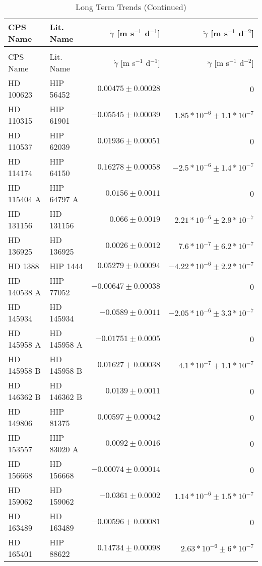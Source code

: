 \begin{longtable*}{llrr}
\caption{Long Term Trends} \\
\toprule
\midrule

CPS Name & Lit. Name & $\dot \gamma$ [m s$^{-1}$ d$^{-1}$] & $\ddot \gamma$ [m s$^{-1}$ d$^{-2}$] \\
\toprule
\endfirsthead
\caption[]{Long Term Trends (Continued)} \\
\toprule
\midrule
CPS Name & Lit. Name & $\dot \gamma$ [m s$^{-1}$ d$^{-1}$] & $\ddot \gamma$ [m s$^{-1}$ d$^{-2}$] \\
\toprule
\endhead
HD 100623 & HIP 56452 & $0.00475\pm 0.00028$ & 0 \\
HD 110315 & HIP 61901 & $-0.05545\pm 0.00039$ & $1.85*10^{-6}\pm 1.1*10^{-7}$ \\
HD 110537 & HIP 62039 & $0.01936\pm 0.00051$ & 0 \\
HD 114174 & HIP 64150 & $0.16278\pm 0.00058$ & $-2.5*10^{-6}\pm 1.4*10^{-7}$ \\
HD 115404 A & HIP 64797 A & $0.0156\pm 0.0011$ & 0 \\
HD 131156 & HD 131156 & $0.066\pm 0.0019$ & $2.21*10^{-6}\pm 2.9*10^{-7}$ \\
HD 136925 & HD 136925 & $0.0026\pm 0.0012$ & $7.6*10^{-7}\pm 6.2*10^{-7}$ \\
HD 1388 & HIP 1444 & $0.05279\pm 0.00094$ & $-4.22*10^{-6}\pm 2.2*10^{-7}$ \\
HD 140538 A & HIP 77052 & $-0.00647\pm 0.00038$ & 0 \\
HD 145934 & HD 145934 & $-0.0589\pm 0.0011$ & $-2.05*10^{-6}\pm 3.3*10^{-7}$ \\
HD 145958 A & HD 145958 A & $-0.01751\pm 0.0005$ & 0 \\
HD 145958 B & HD 145958 B & $0.01627\pm 0.00038$ & $4.1*10^{-7}\pm 1.1*10^{-7}$ \\
HD 146362 B & HD 146362 B & $0.0139\pm 0.0011$ & 0 \\
HD 149806 & HIP 81375 & $0.00597\pm 0.00042$ & 0 \\
HD 153557 & HIP 83020 A & $0.0092\pm 0.0016$ & 0 \\
HD 156668 & HD 156668 & $-0.00074\pm 0.00014$ & 0 \\
HD 159062 & HD 159062 & $-0.0361\pm 0.0002$ & $1.14*10^{-6}\pm 1.5*10^{-7}$ \\
HD 163489 & HD 163489 & $-0.00596\pm 0.00081$ & 0 \\
HD 165401 & HIP 88622 & $0.14734\pm 0.00098$ & $2.63*10^{-6}\pm 6*10^{-7}$ \\

\end{longtable*}
